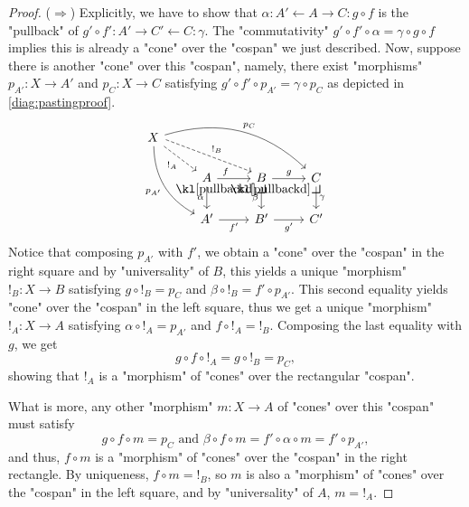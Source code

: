 \documentclass[main.tex]{subfiles}
\begin{document}
\begin{proof}
    ($\Rightarrow$) Explicitly, we have to show that $\alpha : A' \leftarrow A \rightarrow C : g \circ f$ is the "pullback" of $g' \circ f' : A' \rightarrow C' \leftarrow C:\gamma$. The "commutativity" $g'\circ f' \circ \alpha = \gamma \circ g \circ f$ implies this is already a "cone" over the "cospan" we just described. Now, suppose there is another "cone" over this "cospan", namely, there exist "morphisms" $p_{A'}: X \rightarrow A'$ and $p_C: X \rightarrow C$ satisfying $g'\circ f' \circ p_{A'} = \gamma \circ p_C$ as depicted in \eqref{diag:pastingproof}.
    \begin{equation}\label{diag:pastingproof}
        \begin{tikzcd}
            X \arrow[rrrd, "p_C", bend left] \arrow[rdd, "p_{A'}"', bend right] \arrow[rrd, "{!}_B", dashed, shift left] \arrow[rd, "{!}_A"', dashed] & & & \\
            & A \arrow[r, near start, "f"] \arrow[d, "\alpha"'] \arrow[rd, "\pullbackd", phantom, very near start] & B \arrow[r, "g"] \arrow[d, "\beta"'] \arrow[rd, "\pullbackd", phantom, very near start] & C \arrow[d, "\gamma"] \\
            & A' \arrow[r, "f'"'] & B' \arrow[r, "g'"'] & C'
        \end{tikzcd}
    \end{equation}
    Notice that composing $p_{A'}$ with $f'$, we obtain a "cone" over the "cospan" in the right square and by "universality" of $B$, this yields a unique "morphism" ${!}_B: X \rightarrow B$ satisfying $g \circ {!}_B = p_C$ and $\beta \circ {!}_B = f' \circ p_{A'}$. This second equality yields "cone" over the "cospan" in the left square, thus we get a unique "morphism" ${!}_A : X \rightarrow A$ satisfying $\alpha \circ {!}_A = p_{A'}$ and $f \circ {!}_A = {!}_B$. Composing the last equality with $g$, we get
    \[g \circ f \circ {!}_A = g \circ {!}_B = p_C,\]
    showing that ${!}_A$ is a "morphism" of "cones" over the rectangular "cospan".

    What is more, any other "morphism" $m: X \rightarrow A$ of "cones" over this "cospan" must satisfy
    \[g \circ f \circ m = p_C \text{ and } \beta \circ f \circ m = f' \circ \alpha \circ m = f' \circ p_{A'},\]
    and thus, $f\circ m$ is a "morphism" of "cones" over the "cospan" in the right rectangle. By uniqueness, $f\circ m = {!}_B$, so $m$ is also a "morphism" of "cones" over the "cospan" in the left square, and by "universality" of $A$, $m = {!}_A$.
    

\end{proof}
\end{document}

